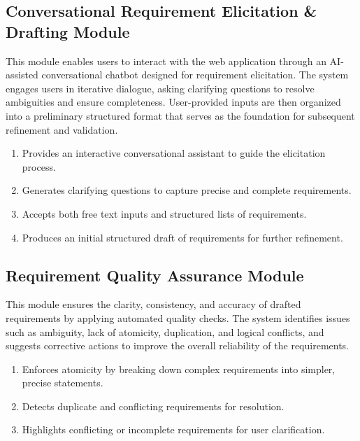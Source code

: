 \subsection{Conversational Requirement Elicitation \& Drafting Module}
This module enables users to interact with the web application through an AI-assisted conversational chatbot designed for requirement elicitation. The system engages users in iterative dialogue, asking clarifying questions to resolve ambiguities and ensure completeness. User-provided inputs are then organized into a preliminary structured format that serves as the foundation for subsequent refinement and validation.  
\begin{enumerate} 
    \item Provides an interactive conversational assistant to guide the elicitation process.  
    \item Generates clarifying questions to capture precise and complete requirements. 
    \item Accepts both free text inputs and structured lists of requirements.  
    \item Produces an initial structured draft of requirements for further refinement.  
\end{enumerate}

\subsection{Requirement Quality Assurance Module}
This module ensures the clarity, consistency, and accuracy of drafted requirements by applying automated quality checks. The system identifies issues such as ambiguity, lack of atomicity, duplication, and logical conflicts, and suggests corrective actions to improve the overall reliability of the requirements.  
\begin{enumerate}
    \item Enforces atomicity by breaking down complex requirements into simpler, precise statements.  
    \item Detects duplicate and conflicting requirements for resolution.  
    \item Highlights conflicting or incomplete requirements for user clarification.  
\end{enumerate}

